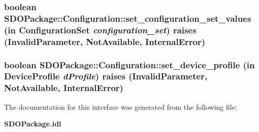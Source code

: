 \subsubsection[{set\_\-configuration\_\-set\_\-values}]{\setlength{\rightskip}{0pt plus 5cm}boolean SDOPackage::Configuration::set\_\-configuration\_\-set\_\-values (in {\bf ConfigurationSet} {\em configuration\_\-set})  raises (InvalidParameter, NotAvailable, InternalError)}\label{interfaceSDOPackage_1_1Configuration_a82d62dcfce26a9cf41bfa79a26a79fa5}
\subsubsection[{set\_\-device\_\-profile}]{\setlength{\rightskip}{0pt plus 5cm}boolean SDOPackage::Configuration::set\_\-device\_\-profile (in {\bf DeviceProfile} {\em dProfile})  raises (InvalidParameter, NotAvailable, InternalError)}\label{interfaceSDOPackage_1_1Configuration_a9bc9b647255e601b692eed2410e43927}


The documentation for this interface was generated from the following file:\begin{DoxyCompactItemize}
\item 
{\bf SDOPackage.idl}\end{DoxyCompactItemize}

